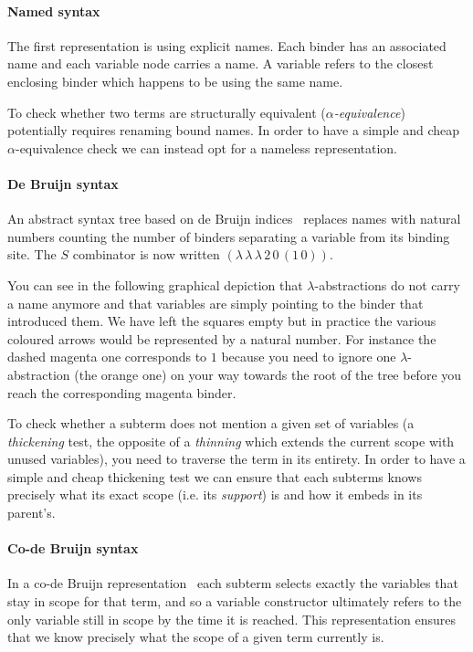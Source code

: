 \paragraph{Named syntax}
The first representation is using explicit names. Each binder has an associated
name and each variable node carries a name. A variable refers to the closest enclosing
binder which happens to be using the same name.


To check whether two terms are structurally equivalent (\emph{$\alpha$-equivalence})
potentially requires renaming bound names.
%
In order to have a simple and cheap $\alpha$-equivalence check we can instead opt
for a nameless representation.

\paragraph{De Bruijn syntax}
An abstract syntax tree based on de Bruijn indices~\cite{MANUAL:journals/math/debruijn72}
replaces names with natural numbers counting the number of binders separating a variable
from its binding site.
%
The $S$ combinator is now written $(\lambda\, \lambda\, \lambda\, 2\, 0\, (1\, 0))$.

You can see in the following graphical depiction that
$\lambda$-abstractions do not carry a name anymore and that variables are simply pointing
to the binder that introduced them. We have left the squares empty but in practice
the various coloured arrows would be represented by a natural number.
%
For instance the {\color{magenta}dashed magenta} one corresponds to $1$
because you need to ignore one $\lambda{}$-abstraction
(the {\color{orange}orange} one) on your way towards the root of the tree
before you reach the corresponding magenta binder.


To check whether a subterm does not mention a given set of variables
(a \emph{thickening} test, the opposite of a \emph{thinning} which extends the
current scope with unused variables), you need to traverse the term in its entirety.
%
In order to have a simple and cheap thickening test we can ensure that each subterms
knows precisely what its exact scope (i.e. its \emph{support}) is and how it embeds
in its parent's.

\paragraph{Co-de Bruijn syntax}
In a co-de Bruijn
representation~\cite{DBLP:journals/corr/abs-1807-04085} each subterm
selects exactly the variables that stay in scope for that term,
and so a variable constructor ultimately refers to the only variable still
in scope by the time it is reached.
%
This representation ensures that we know precisely what the scope of a given term
currently is.

